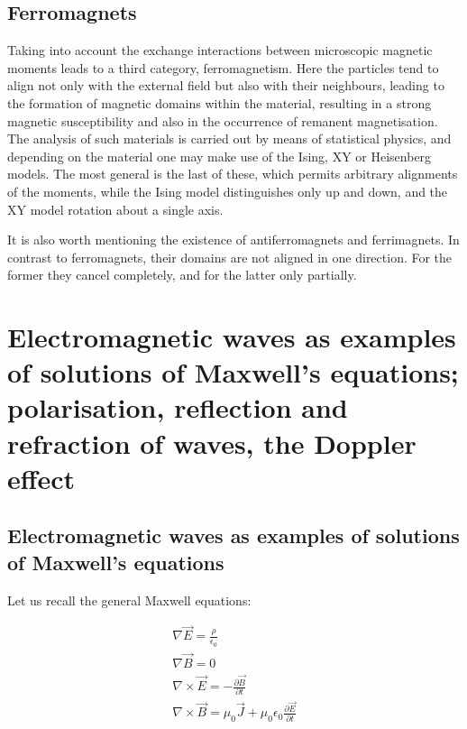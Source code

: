 \subsection{Ferromagnets}

Taking into account the exchange interactions between microscopic magnetic moments leads to a third category, ferromagnetism. Here the particles tend to align not only with the external field but also with their neighbours, leading to the formation of magnetic domains within the material, resulting in a strong magnetic susceptibility and also in the occurrence of remanent magnetisation. The analysis of such materials is carried out by means of statistical physics, and depending on the material one may make use of the Ising, XY or Heisenberg models. The most general is the last of these, which permits arbitrary alignments of the moments, while the Ising model distinguishes only up and down, and the XY model rotation about a single axis.

It is also worth mentioning the existence of antiferromagnets and ferrimagnets. In contrast to ferromagnets, their domains are not aligned in one direction. For the former they cancel completely, and for the latter only partially.

\section{Electromagnetic waves as examples of solutions of Maxwell's equations; polarisation, reflection and refraction of waves, the Doppler effect}

\subsection{Electromagnetic waves as examples of solutions of Maxwell's equations}

Let us recall the general Maxwell equations:

\begin{equation}
    \begin{matrix}
    \nabla \vec{E} = \frac{\rho}{\epsilon_{0}}\\
    \nabla \vec{B} = 0\\
    \nabla\times\vec{E} = -\frac{\partial \vec{B}}{\partial t}\\
    \nabla\times\vec{B} = \mu_{0}\vec{J} + \mu_{0}\epsilon_{0}\frac{\partial\vec{E}}{\partial t}
    \end{matrix}
\end{equation}

